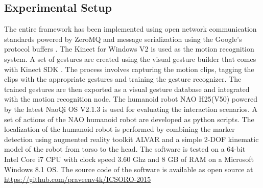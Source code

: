 \documentclass{llncs}
\begin{document}
\subsection{Experimental Setup}
\quad The entire framework has been implemented using open network communication standards powered by ZeroMQ \cite{ZeroMQ} and message serialization using the Google's protocol buffers \cite{ProtocolBuffers}. The Kinect for Windows V2 is used as the motion recognition system. A set of gestures are created using the visual gesture builder that comes with Kinect SDK \cite{Kinect2014}. The process involves capturing the motion clips, tagging the clips with the appropriate gestures and training the gesture recognizer. The trained gestures are then exported as a visual gesture database and integrated with the motion recognition node. The humanoid robot NAO H25(V50) powered by the latest NaoQi OS V2.1.3 is used for evaluating the interaction scenarios.  A set of actions of the NAO humanoid robot are developed as python scripts. The localization of the humanoid robot is performed by combining the marker detection using augmented reality toolkit ALVAR \cite{ALVAR} and a simple 2-DOF kinematic model of the robot from torso to the head. The software is tested on a 64-bit Intel Core i7 CPU with clock speed 3.60 Ghz and 8 GB of RAM on a Microsoft Windows 8.1 OS. The source code of the software is available as open source at \url{https://github.com/praveenv4k/ICSORO-2015}
\end{document}
